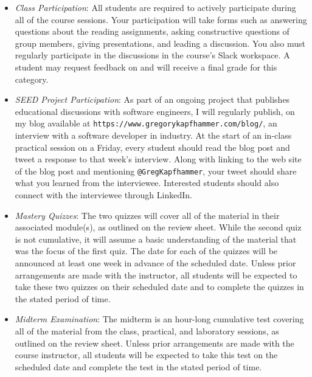 \documentclass[11pt]{article}
\newcommand{\url}[1]{\lstinline{#1}}
\begin{document}
\begin{itemize}

  \item {\em Class Participation\/}: All students are required to actively
    participate during all of the course sessions. Your participation will take
    forms such as answering questions about the reading assignments, asking
    constructive questions of group members, giving presentations, and leading a
    discussion. You also must regularly participate in the discussions in the
    course's Slack workspace. A student may request feedback on and will receive a
    final grade for this category.

  \item {\em SEED Project Participation\/}: As part of an ongoing project that
    publishes educational discussions with software engineers, I will regularly
    publish, on my blog available at
    \url{https://www.gregorykapfhammer.com/blog/}, an interview with a software
    developer in industry. At the start of an in-class practical session on a
    Friday, every student should read the blog post and tweet a response to
    that week's interview. Along with linking to the web site of the blog post
    and mentioning \url{@GregKapfhammer}, your tweet should share what you
    learned from the interviewee. Interested students should also connect with
    the interviewee through LinkedIn.

  \item {\em Mastery Quizzes\/}: The two quizzes will cover all of the material
    in their associated module(s), as outlined on the review sheet. While the
    second quiz is not cumulative, it will assume a basic understanding of the
    material that was the focus of the first quiz. The date for each of the
    quizzes will be announced at least one week in advance of the scheduled
    date. Unless prior arrangements are made with the instructor, all students
    will be expected to take these two quizzes on their scheduled date and to
    complete the quizzes in the stated period of time.

  \item {\em Midterm Examination\/}: The midterm is an hour-long cumulative test
    covering all of the material from the class, practical, and laboratory
    sessions, as outlined on the review sheet. Unless prior arrangements are
    made with the course instructor, all students will be expected to take this
    test on the scheduled date and complete the test in the stated period of
    time.


\end{itemize}
\end{document}
